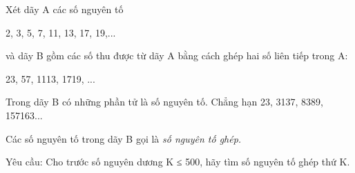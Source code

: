 Xét dãy A các số nguyên tố  

   2, 3, 5, 7, 11, 13, 17, 19,...  

   và dãy B gồm các số thu được từ dãy A bằng cách ghép hai số liên tiếp trong A:  

   23, 57, 1113, 1719, ...  

   Trong dãy B có những phần tử là số nguyên tố. Chẳng hạn 23, 3137, 8389, 157163...  

   Các số nguyên tố trong dãy B gọi là   \textit{    số nguyên tố ghép.   }

   Yêu cầu: Cho trước số nguyên dương K ≤ 500, hãy tìm số nguyên tố ghép thứ K.  

\